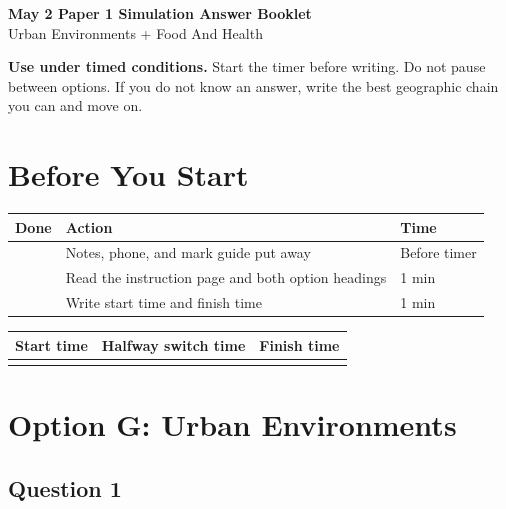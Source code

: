 \documentclass[11pt,a4paper]{article}
\newcommand{\todobox}{\fbox{\rule{0pt}{0.8em}\rule{0.8em}{0pt}}}
\begin{document}
\begin{center}
{\sffamily\bfseries\color{HeadingBlue}\LARGE May 2 Paper 1 Simulation Answer Booklet}\\[0.25em]
{\sffamily\color{AccentTeal}\large Urban Environments + Food And Health}
\end{center}

\noindent\colorbox{SoftBlue}{%
\begin{minipage}{0.965\textwidth}
\sffamily
\textbf{\textcolor{HeadingBlue}{Use under timed conditions.}}
Start the timer before writing. Do not pause between options. If you do not
know an answer, write the best geographic chain you can and move on.
\end{minipage}
}

\section{Before You Start}

\begin{tabularx}{\textwidth}{L{0.16\textwidth}Y L{0.19\textwidth}}
\toprule
\textbf{Done} & \textbf{Action} & \textbf{Time} \\
\midrule
\todobox & Notes, phone, and mark guide put away & Before timer \\
\todobox & Read the instruction page and both option headings & 1 min \\
\todobox & Write start time and finish time & 1 min \\
\bottomrule
\end{tabularx}

\vspace{0.35em}

\begin{tabularx}{\textwidth}{L{0.24\textwidth}Y Y}
\toprule
\textbf{Start time} & \textbf{Halfway switch time} & \textbf{Finish time} \\
\midrule
\rule{0pt}{1cm} & & \\
\bottomrule
\end{tabularx}

\newpage

\section{Option G: Urban Environments}

\subsection{Question 1}
\end{document}
